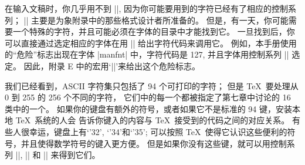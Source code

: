 {%
在输入文稿时，你几乎用不到 |\char|, 因为你可能要用到的字符已经有了相应的控制系列；
|\char| 主要是为象附录中的那些格式设计者所准备的。%
但是，有一天，你可能需要一个特殊的字符，并且可能必须在字体的目录中才能找到它。%
一旦找到后，你可以直接通过选定相应的字体在用 |\char| 给出字符代码来调用它。%
例如，本手册使用的``危险''标志出现在字体 |manfnt| 中，字符代码是 127,
并且字体用控制系列 |\manual| 选定。%
因此，附录 E 中的宏用`|{\manual{}}|'来给出这个危险标志。

我们已经看到，ASCII 字符集只包括了 94 个可打印的字符；
但是 \TeX\ 要处理从 0 到 255 的 256 个不同的字符，
它们中的每一个都被指定了第七章中讨论的 16 类中的一个。%
如果你的键盘有额外的符号，或者如果它不是标准的 94 键，安装本地 \TeX\ 系统的人会%
告诉你键入的内容与 \TeX\ 接受到的代码之间的对应关系。%
\1有些人很幸运，键盘上有`{\tentex\char'32}', `{\tentex\char'34}'和`{\tentex\char'35}';
可以按照 \TeX\ 使得它认识这些便利的符号，并且使得数学符号的键入更方便。%
但是如果你没有这些键，就可以用控制系列 |\ne|, |\le| 和 |\ge| 来得到它们。

}
